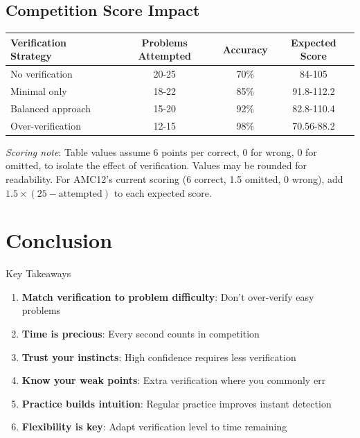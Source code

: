 \documentclass{article}
\begin{document}
\subsection{Competition Score Impact}

\begin{center}
\begin{tabular}{|l|c|c|c|}
\hline
\textbf{Verification Strategy} & \textbf{Problems Attempted} & \textbf{Accuracy} & \textbf{Expected Score} \\
\hline
No verification & 20-25 & 70\% & 84-105 \\
Minimal only & 18-22 & 85\% & 91.8-112.2 \\
Balanced approach & 15-20 & 92\% & 82.8-110.4 \\
Over-verification & 12-15 & 98\% & 70.56-88.2 \\
\hline
\end{tabular}
\end{center}

\noindent\small\textit{Scoring note}: Table values assume 6 points per correct, 0 for wrong, 0 for omitted, to isolate the effect of verification. Values may be rounded for readability. For AMC12's current scoring (6 correct, 1.5 omitted, 0 wrong), add $1.5\times(25-\text{attempted})$ to each expected score.

\newpage

\section{Conclusion}

\begin{strategybox}{Key Takeaways}
\begin{enumerate}
\item \textbf{Match verification to problem difficulty}: Don't over-verify easy problems
\item \textbf{Time is precious}: Every second counts in competition
\item \textbf{Trust your instincts}: High confidence requires less verification
\item \textbf{Know your weak points}: Extra verification where you commonly err
\item \textbf{Practice builds intuition}: Regular practice improves instant detection
\item \textbf{Flexibility is key}: Adapt verification level to time remaining
\end{enumerate}
\end{strategybox}
\end{document}
